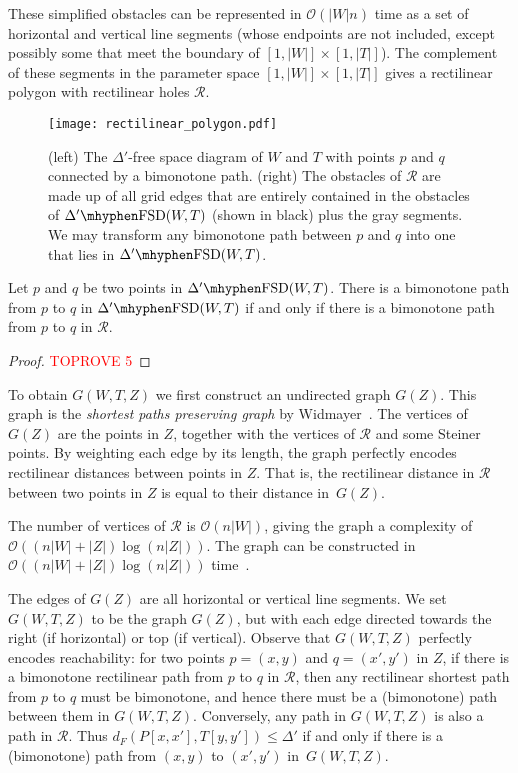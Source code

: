 \documentclass[a4paper,UKenglish,cleveref,thm-restate,notab]{lipics-v2021}
\newcommand{\dF}{\ensuremath{d_F}}
\newcommand{\FSD}[1][\Delta'] {\ensuremath{#1}\mhyphen\mathrm{FSD}}
\newcommand{\bigO}{\mathcal{O}}
\begin{document}
    These simplified obstacles can be represented in $\bigO(|W| n)$ time as a set of horizontal and vertical line segments (whose endpoints are not included, except possibly some that meet the boundary of $[1, |W|] \times [1, |T|]$).
    The complement of these segments in the parameter space $[1, |W|] \times [1, |T|]$ gives a rectilinear polygon with rectilinear holes $\mathcal{R}$.

    \begin{figure}
        \centering
        \texttt{[image: rectilinear\_polygon.pdf]}
        \caption{(left) The $\Delta'$-free space diagram of $W$ and $T$ with points $p$ and $q$ connected by a bimonotone path. 
        (right) The obstacles of $\mathcal{R}$ are made up of all grid edges that are entirely contained in the obstacles of $\FSD(W, T)$ (shown in black) plus the gray segments.
        We may transform any bimonotone path between $p$ and $q$ into one that lies in $\FSD(W, T)$.
        }
        \label{fig:polygon}
    \end{figure}

    \begin{lemma}
    \label{lem:simplified_FSD}
        Let $p$ and $q$ be two points in $\FSD(W, T)$.
        There is a bimonotone path from $p$ to $q$ in $\FSD(W, T)$ if and only if there is a bimonotone path from $p$ to $q$ in $\mathcal{R}$.
    \end{lemma}
    \begin{proof}\textcolor{red}{TOPROVE 5}\end{proof}

    \noindent
    To obtain $G(W, T, Z)$ we first construct an undirected graph $G(Z)$.
    This graph is the \emph{shortest paths preserving graph} by Widmayer~\cite{widmayer91rectilinear_graphs}.
    The vertices of $G(Z)$ are the points in $Z$, together with the vertices of $\mathcal{R}$ and some Steiner points.
    By weighting each edge by its length, the graph perfectly encodes rectilinear distances between points in $Z$.
    That is, the rectilinear distance in $\mathcal{R}$ between two points in $Z$ is equal to their distance in~$G(Z)$.
    
    The number of vertices of $\mathcal{R}$ is $\bigO(n |W|)$, giving the graph a complexity of $\bigO((n |W| + |Z|) \log (n|Z|))$.
    The graph can be constructed in $\bigO((n |W| + |Z|) \log (n|Z|))$ time~\cite{widmayer91rectilinear_graphs}.
    
    The edges of $G(Z)$ are all horizontal or vertical line segments.
    We set $G(W, T, Z)$ to be the graph $G(Z)$, but with each edge directed towards the right (if horizontal) or top (if vertical).
    Observe that $G(W, T, Z)$ perfectly encodes reachability: for two points $p = (x, y)$ and $q = (x', y')$ in $Z$, if there is a bimonotone rectilinear path from $p$ to $q$ in $\mathcal{R}$, then any rectilinear shortest path from $p$ to $q$ must be bimonotone, and hence there must be a (bimonotone) path between them in $G(W, T, Z)$.
    Conversely, any path in $G(W, T, Z)$ is also a path in $\mathcal{R}$.
    Thus $\dF(P[x, x'], T[y, y']) \leq \Delta'$ if and only if there is a (bimonotone) path from $(x, y)$ to $(x', y')$ in~$G(W, T, Z)$.
\end{document}
